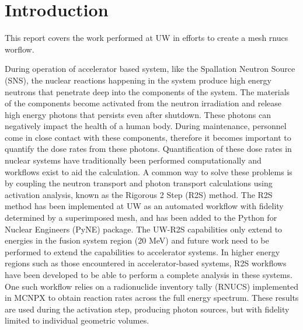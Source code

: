 \section{Introduction}\label{sc:intro}
This report covers the work performed at UW in efforts to create a mesh rnucs 
worflow.

During operation of accelerator based system, like the Spallation Neutron
Source (SNS), the nuclear reactions happening in the system produce high
energy neutrons that penetrate deep into the components of the system.
The materials of the components become activated from the neutron irradiation
and release high energy photons that persists even after shutdown. These
photons can negatively impact the health of a human body. During maintenance,
personnel come in close contact with these components, therefore it becomes
important to quantify the dose rates from these photons.
Quantification of these dose rates in nuclear systems have traditionally been
performed computationally and workflows exist to aid the calculation.
A common way to solve these problems is by coupling the neutron transport and
photon transport calculations using activation analysis, known as the Rigorous
2 Step (R2S) method. The R2S method has been implemented at UW as an automated
workflow with fidelity determined by a superimposed mesh, and has been added
to the Python for Nuclear Engineers  (PyNE) package. The UW-R2S capabilities
only extend to energies in the fusion system region (20 MeV) and future work
need to be performed to extend the capabilities to accelerator systems.
In higher energy regions such as those encountered in accelerator-based
systems, R2S workflows have been developed to be able to perform a complete
analysis in these systems. One such workflow relies on a radionuclide
inventory tally (RNUCS) implemented in MCNPX to obtain reaction rates across
the full energy spectrum.  These results are used during the activation step,
producing photon sources, but with fidelity limited to individual geometric
volumes.


